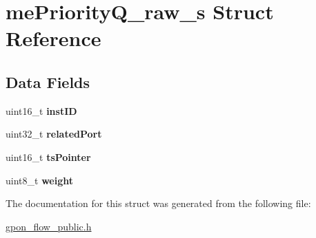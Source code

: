 \hypertarget{structmePriorityQ__raw__s}{}\section{me\+Priority\+Q\+\_\+raw\+\_\+s Struct Reference}
\label{structmePriorityQ__raw__s}
\subsection*{Data Fields}
\begin{DoxyCompactItemize}
\item 
\mbox{\label{structmePriorityQ__raw__s_a38a3a461f3f5551912fc4045df73e254}} 
uint16\+\_\+t {\bfseries inst\+ID}
\item 
\mbox{\label{structmePriorityQ__raw__s_a1443936bf9336afd5b4672f12ddeef9d}} 
uint32\+\_\+t {\bfseries related\+Port}
\item 
\mbox{\label{structmePriorityQ__raw__s_ae6fc0cae6aa6245ad35262a6339aede1}} 
uint16\+\_\+t {\bfseries ts\+Pointer}
\item 
\mbox{\label{structmePriorityQ__raw__s_a6bc10ee71eddafd788c2168786de07db}} 
uint8\+\_\+t {\bfseries weight}
\end{DoxyCompactItemize}


The documentation for this struct was generated from the following file\+:\begin{DoxyCompactItemize}
\item 
\hyperlink{gpon__flow__public_8h}{gpon\+\_\+flow\+\_\+public.\+h}\end{DoxyCompactItemize}
